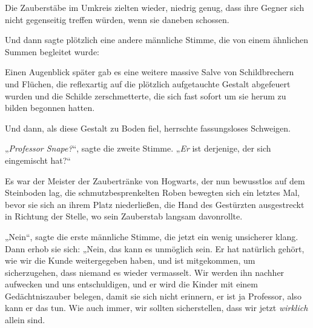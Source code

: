 Die Zauberstäbe im Umkreis zielten wieder, niedrig genug, dass ihre Gegner sich nicht gegenseitig treffen würden, wenn sie daneben schossen.

Und dann sagte plötzlich eine andere männliche Stimme, die von einem ähnlichen Summen begleitet wurde: 

Einen Augenblick später gab es eine weitere massive Salve von Schildbrechern und Flüchen, die reflexartig auf die plötzlich aufgetauchte Gestalt abgefeuert wurden und die Schilde zerschmetterte, die sich fast sofort um sie herum zu bilden begonnen hatten.

Und dann, als diese Gestalt zu Boden fiel, herrschte fassungsloses Schweigen.

„\emph{Professor Snape?}“, sagte die zweite Stimme. „\emph{Er} ist derjenige, der sich eingemischt hat?“

Es war der Meister der Zaubertränke von Hogwarts, der nun bewusstlos auf dem Steinboden lag, die schmutzbesprenkelten Roben bewegten sich ein letztes Mal, bevor sie sich an ihrem Platz niederließen, die Hand des Gestürzten ausgestreckt in Richtung der Stelle, wo sein Zauberstab langsam davonrollte.

„Nein“, sagte die erste männliche Stimme, die jetzt ein wenig unsicherer klang. Dann erhob sie sich:
„Nein, das kann es unmöglich sein. Er hat natürlich gehört, wie wir die Kunde weitergegeben haben, und ist mitgekommen, um sicherzugehen, dass niemand es wieder vermasselt. Wir werden ihn nachher aufwecken und uns entschuldigen, und er wird die Kinder mit einem Gedächtniszauber belegen, damit sie sich nicht erinnern, er ist ja Professor, also kann er das tun. Wie auch immer, wir sollten sicherstellen, dass wir jetzt \emph{wirklich} allein sind. 

